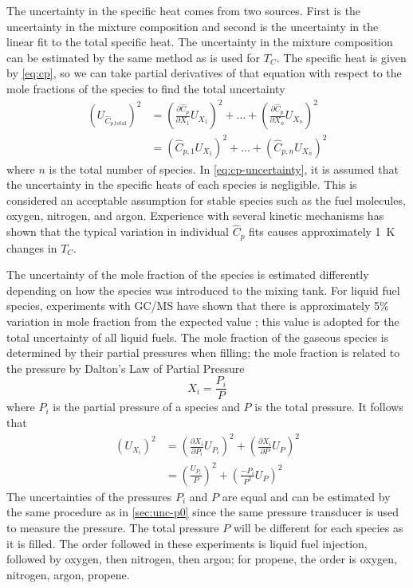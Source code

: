 \documentclass[../main.tex]{subfiles}
\begin{document}
The uncertainty in the specific heat comes from two sources. First is the
uncertainty in the mixture composition and second is the uncertainty in
the linear fit to the total specific heat. The uncertainty in the mixture
composition can be estimated by the same method as is used for $T_C$. The
specific heat is given by \autoref{eq:cp}, so we can take partial derivatives
of that equation with respect to the mole fractions of the species to find
the total uncertainty
%
\begin{equation}
\label{eq:cp-uncertainty}
\begin{split}
\left(U_{\hat{C}_{p\text{,total}}}\right)^2 &= \left(\frac{\partial \hat{C}_p}{\partial X_1} U_{X_1}\right)^2 + \ldots + \left(\frac{\partial \hat{C}_p}{\partial X_n} U_{X_n}\right)^2 \\
&= \left(\hat{C}_{p,1} U_{X_1}\right)^2 + \ldots + \left(\hat{C}_{p,n} U_{X_n}\right)^2
\end{split}
\end{equation}
%
where $n$ is the total number of species. In \autoref{eq:cp-uncertainty},
it is assumed that the uncertainty in the specific heats of each species
is negligible. This is considered an acceptable assumption for stable species
such as the fuel molecules, oxygen, nitrogen, and argon. Experience with
several kinetic mechanisms has shown that the typical variation in individual
$\hat{C}_p$ fits causes approximately \SI{1}{\kelvin} changes in $T_C$.

The uncertainty of the mole fraction of the species is estimated differently
depending on how the species was introduced to the mixing tank. For liquid fuel
species, experiments with GC/MS have shown that there is approximately 5\%
variation in mole fraction from the expected value \cite{Weber2011}; this value is adopted for
the total uncertainty of all liquid fuels. The mole fraction of the gaseous species
is determined by their partial pressures when filling; the mole fraction is
related to the pressure by Dalton's Law of Partial Pressure
\cite{Dalton1801,Gillespie1930}
%
\begin{equation}
X_i = \frac{P_i}{P}
\end{equation}
%
where $P_i$ is the partial pressure of a species and $P$ is the total pressure.
It follows that
%
\begin{equation}
\begin{split}
\left(U_{X_i}\right)^2 &= \left(\frac{\partial X_i}{\partial P_i} U_{P_i}\right)^2 + \left(\frac{\partial X_i}{\partial P} U_P\right)^2 \\
&= \left(\frac{U_{P_i}}{P}\right)^2 + \left(\frac{{-P_i}}{P^2} U_P\right)^2
\end{split}
\end{equation}
%
The uncertainties of the pressures $P_i$ and $P$ are equal and can be estimated by
the same procedure as in \autoref{sec:unc-p0} since the same pressure transducer
is used to measure the pressure. The total pressure $P$ will be different for
each species as it is filled. The order followed in these experiments is
liquid fuel injection, followed by oxygen, then nitrogen, then argon; for
propene, the order is oxygen, nitrogen, argon, propene.
\end{document}

